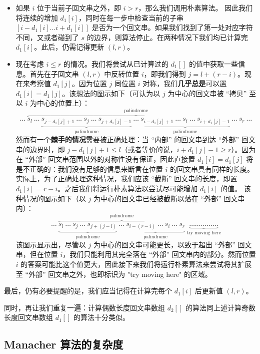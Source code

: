 \begin{itemize}
\item 如果 $i$ 位于当前子回文串之外，即 $i > r$，那么我们调用朴素算法。
因此我们将连续的增加 $d_1[i]$，同时在每一步中检查当前的子串 $[i - d_1[i] \dots i + d_1[i]]$ 是否为一个回文串。如果我们找到了第一处对应字符不同，又或者碰到了 $s$ 的边界，则算法停止。在两种情况下我们均已计算完 $d_1[i]$。此后，仍需记得更新 $(l, r)$。
\item 现在考虑 $i \le r$ 的情况。我们将尝试从已计算过的 $d_1[]$ 的值中获取一些信息。首先在子回文串 $(l, r)$ 中反转位置 $i$，即我们得到 $j = l + (r - i)$。现在来考察值 $d_1[j]$。因为位置 $j$ 同位置 $i$ 对称，我们\textbf{几乎总是}可以置 $d_1[i] = d_1[j]$。该想法的图示如下（可认为以 $j$ 为中心的回文串被 “拷贝” 至以 $i$ 为中心的位置上）：
$$
\ldots\ 
\overbrace{
    s_l\ \ldots\ 
    \underbrace{
        s_{j-d_1[j]+1}\ \ldots\ s_j\ \ldots\ s_{j+d_1[j]-1}
    }_\text{palindrome}\ 
    \ldots\ 
    \underbrace{
        s_{i-d_1[j]+1}\ \ldots\ s_i\ \ldots\ s_{i+d_1[j]-1}
    }_\text{palindrome}\ 
    \ldots\ s_r
}^\text{palindrome}\ 
\ldots
$$
然而有一个\textbf{棘手的情况}需要被正确处理：当 “内部” 的回文串到达 “外部” 回文串的边界时，即 $j - d_1[j] + 1 \le l$（或者等价的说，$i + d_1[j] - 1 \ge r$）。因为在 “外部” 回文串范围以外的对称性没有保证，因此直接置 $d_1[i] = d_1[j]$ 将是不正确的：我们没有足够的信息来断言在位置 $i$ 的回文串具有同样的长度。
实际上，为了正确处理这种情况，我们应该 “截断” 回文串的长度，即置 $d_1[i] = r - i$。之后我们将运行朴素算法以尝试尽可能增加 $d_1[i]$ 的值。
该种情况的图示如下（以 $j$ 为中心的回文串已经被截断以落在 “外部” 回文串内）：
$$
\ldots\ 
\overbrace{
    \underbrace{
        s_l\ \ldots\ s_j\ \ldots\ s_{j+(j-l)}
    }_\text{palindrome}\ 
    \ldots\ 
    \underbrace{
        s_{i-(r-i)}\ \ldots\ s_i\ \ldots\ s_r
    }_\text{palindrome}
}^\text{palindrome}\ 
\underbrace{
    \ldots \ldots \ldots \ldots \ldots
}_\text{try moving here}
$$
该图示显示出，尽管以 $j$ 为中心的回文串可能更长，以致于超出 “外部” 回文串，但在位置 $i$，我们只能利用其完全落在 “外部” 回文串内的部分。然而位置 $i$ 的答案可能比这个值更大，因此接下来我们将运行朴素算法来尝试将其扩展至 “外部” 回文串之外，也即标识为 "try moving here" 的区域。
\end{itemize}

最后，仍有必要提醒的是，我们应当记得在计算完每个 $d_1[i]$ 后更新值 $(l, r)$。

同时，再让我们重复一遍：计算偶数长度回文串数组 $d_2[]$ 的算法同上述计算奇数长度回文串数组 $d_1[]$ 的算法十分类似。

\subsection{Manacher 算法的复杂度}

